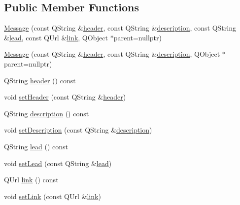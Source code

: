 \subsection*{Public Member Functions}
\begin{DoxyCompactItemize}
\item 
\mbox{\hyperlink{classQRail_1_1AlertsEngine_1_1Message_a9867f44f407fac012b4a29299dac9717}{Message}} (const Q\+String \&\mbox{\hyperlink{classQRail_1_1AlertsEngine_1_1Message_afa82f8ebbc074c3131254782a11c7414}{header}}, const Q\+String \&\mbox{\hyperlink{classQRail_1_1AlertsEngine_1_1Message_a0915a09de9f161ca15af08e198c3aef5}{description}}, const Q\+String \&\mbox{\hyperlink{classQRail_1_1AlertsEngine_1_1Message_a9dae467ea28e07e75d2b18f113516552}{lead}}, const Q\+Url \&\mbox{\hyperlink{classQRail_1_1AlertsEngine_1_1Message_a230424a1a57b9616ab6057cfa0d9aeba}{link}}, Q\+Object $\ast$parent=nullptr)
\item 
\mbox{\hyperlink{classQRail_1_1AlertsEngine_1_1Message_a453a2731f60a132e3e4bb39e08dbcf4c}{Message}} (const Q\+String \&\mbox{\hyperlink{classQRail_1_1AlertsEngine_1_1Message_afa82f8ebbc074c3131254782a11c7414}{header}}, const Q\+String \&\mbox{\hyperlink{classQRail_1_1AlertsEngine_1_1Message_a0915a09de9f161ca15af08e198c3aef5}{description}}, Q\+Object $\ast$parent=nullptr)
\item 
Q\+String \mbox{\hyperlink{classQRail_1_1AlertsEngine_1_1Message_afa82f8ebbc074c3131254782a11c7414}{header}} () const
\item 
void \mbox{\hyperlink{classQRail_1_1AlertsEngine_1_1Message_af952ee41f2bd04126b5c73aa20c8fccc}{set\+Header}} (const Q\+String \&\mbox{\hyperlink{classQRail_1_1AlertsEngine_1_1Message_afa82f8ebbc074c3131254782a11c7414}{header}})
\item 
Q\+String \mbox{\hyperlink{classQRail_1_1AlertsEngine_1_1Message_a0915a09de9f161ca15af08e198c3aef5}{description}} () const
\item 
void \mbox{\hyperlink{classQRail_1_1AlertsEngine_1_1Message_a205d7904e25de29a259b7f68d4dac2a7}{set\+Description}} (const Q\+String \&\mbox{\hyperlink{classQRail_1_1AlertsEngine_1_1Message_a0915a09de9f161ca15af08e198c3aef5}{description}})
\item 
Q\+String \mbox{\hyperlink{classQRail_1_1AlertsEngine_1_1Message_a9dae467ea28e07e75d2b18f113516552}{lead}} () const
\item 
void \mbox{\hyperlink{classQRail_1_1AlertsEngine_1_1Message_a737ca83ba775f3c836cff2530ff2449d}{set\+Lead}} (const Q\+String \&\mbox{\hyperlink{classQRail_1_1AlertsEngine_1_1Message_a9dae467ea28e07e75d2b18f113516552}{lead}})
\item 
Q\+Url \mbox{\hyperlink{classQRail_1_1AlertsEngine_1_1Message_a230424a1a57b9616ab6057cfa0d9aeba}{link}} () const
\item 
void \mbox{\hyperlink{classQRail_1_1AlertsEngine_1_1Message_aa4c1f5cd9f81e74b7dd7a43c18e267cf}{set\+Link}} (const Q\+Url \&\mbox{\hyperlink{classQRail_1_1AlertsEngine_1_1Message_a230424a1a57b9616ab6057cfa0d9aeba}{link}})
\end{DoxyCompactItemize}


